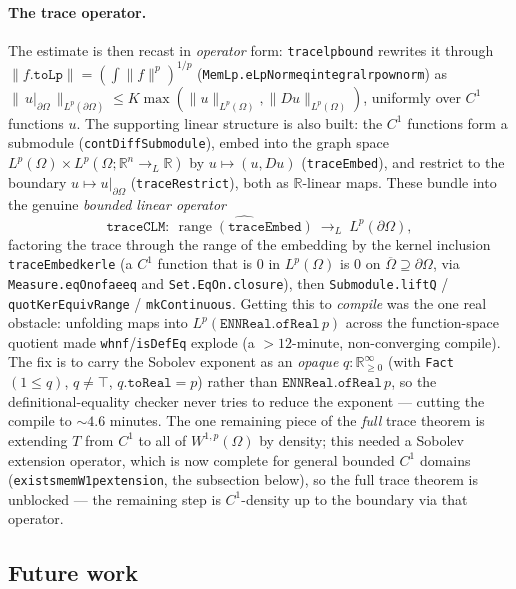 ﻿\documentclass[12pt, a4paper]{article}
\renewcommand{\_}{\origunderscore\allowbreak}
\theoremstyle{definition}
\theoremstyle{plain}
\begin{document}
\paragraph{The trace operator.}  The estimate is then recast in \emph{operator} form: \texttt{trace\_lp\_bound} rewrites it through
$\|f.\mathtt{toLp}\|=(\int\|f\|^p)^{1/p}$ (\texttt{MemLp.eLpNorm\_eq\_integral\_rpow\_norm}) as
$\|\,u|_{\partial\Omega}\,\|_{L^p(\partial\Omega)}\le K\max(\|u\|_{L^p(\Omega)},\|Du\|_{L^p(\Omega)})$,
uniformly over $C^1$ functions $u$.  The supporting linear structure is also built: the $C^1$
functions form a submodule (\texttt{contDiffSubmodule}), embed into the graph space
$L^p(\Omega)\times L^p(\Omega;\mathbb{R}^n{\to_L}\mathbb{R})$ by $u\mapsto(u,Du)$
(\texttt{traceEmbed}), and restrict to the boundary $u\mapsto u|_{\partial\Omega}$
(\texttt{traceRestrict}), both as $\mathbb{R}$-linear maps.  These bundle into the genuine
\emph{bounded linear operator}
\[
  \texttt{traceCLM}\colon\ \widehat{\operatorname{range}(\texttt{traceEmbed})}\ \to_L\ L^p(\partial\Omega),
\]
factoring the trace through the range of the embedding by the kernel inclusion
\texttt{traceEmbed\_ker\_le} (a $C^1$ function that is $0$ in $L^p(\Omega)$ is $0$ on
$\overline\Omega\supseteq\partial\Omega$, via \texttt{Measure.eqOn\_of\_ae\_eq} and
\texttt{Set.EqOn.closure}), then \texttt{Submodule.liftQ} / \texttt{quotKerEquivRange} /
\texttt{mkContinuous}.  Getting this to \emph{compile} was the one real obstacle: unfolding maps into
$L^p(\mathtt{ENNReal.ofReal}\,p)$ across the function-space quotient made \texttt{whnf}/\texttt{isDefEq}
explode (a $>\!12$-minute, non-converging compile).  The fix is to carry the Sobolev exponent as an
\emph{opaque} $q:\mathbb{R}_{\ge0}^\infty$ (with \texttt{Fact}\,$(1\le q)$, $q\ne\top$,
$q.\mathtt{toReal}=p$) rather than $\mathtt{ENNReal.ofReal}\,p$, so the definitional-equality checker
never tries to reduce the exponent --- cutting the compile to $\sim\!4.6$ minutes.  The one remaining
piece of the \emph{full} trace theorem is extending $T$ from $C^1$ to all of $W^{1,p}(\Omega)$ by
density; this needed a Sobolev extension operator, which is now complete for general bounded $C^1$
domains (\texttt{exists\_memW1p\_extension}, the subsection below), so the full trace theorem is
unblocked --- the remaining step is $C^1$-density up to the boundary via that operator.

\subsection{Future work}
\end{document}
